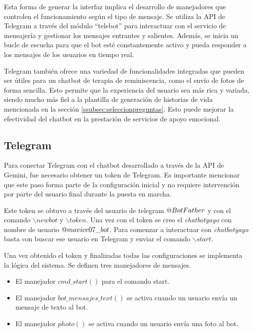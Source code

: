Esta forma de generar la interfaz implica el desarrollo de manejadores que controlen el funcionamiento según el tipo de mensaje. 
Se utiliza la API de Telegram a través del módulo ``telebot'' para interactuar con el servicio de mensajería y gestionar los mensajes entrantes y salientes. Además, se inicia un bucle de escucha para que el bot esté constantemente activo y pueda responder a los mensajes de los usuarios en tiempo real.

Telegram también ofrece una variedad de funcionalidades integradas que pueden ser útiles para un chatbot de terapia de reminiscencia, como el envío de fotos de forma sencilla. Esto permite que la experiencia del usuario sea más rica y variada, siendo mucho más fiel a la plantilla de generación de historias de vida mencionada en la sección \ref{ssubsec:seleccionpreguntas}. Esto puede mejorar la efectividad del chatbot en la prestación de servicios de apoyo emocional.

\subsection{Telegram}
\label{sec:Telegram}

Para conectar Telegram con el chatbot desarrollado a través de la API de Gemini, fue necesario obtener un token de Telegram. Es importante mencionar que este paso forma parte de la configuración inicial y no requiere intervención por parte del usuario final durante la puesta en marcha.

Este token se obtuvo a través del usuario de telegram $\makeatletter @ BotFather$ y con el comando $\backslash newbot$ y $\backslash token$. Una vez con el token se creo el \textit{chatbotyayo} con nombre de usuario $\makeatletter @ mavice07\_bot$. Para comenzar a interactuar con \textit{chatbotyayo} basta con buscar ese usuario en Telegram y enviar el comando $\backslash start$. 

Una vez obtenido el token y finalizadas todas las configuraciones se implementa la lógica del sistema. Se definen tres manejadores de mensajes.
\begin{itemize}
	\item El manejador $cmd\_start()$ para el comando start. 
	
	\item El manejador $bot\_mensajes\_text()$ se activa cuando un usuario envía un mensaje de texto al bot.
	
	\item El manejador $photo()$ se activa cuando un usuario envía una foto al bot. 
\end{itemize}

